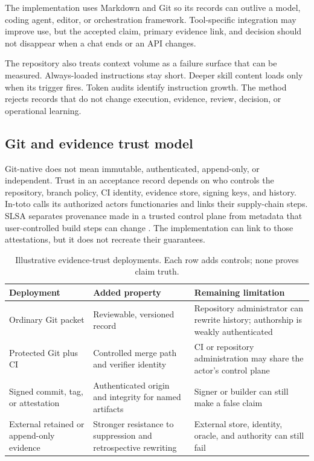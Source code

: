 \documentclass[11pt]{article}
\begin{document}
The implementation uses Markdown and Git so its records can outlive a model, coding agent, editor, or orchestration framework. Tool-specific integration may improve use, but the accepted claim, primary evidence link, and decision should not disappear when a chat ends or an API changes.

The repository also treats context volume as a failure surface that can be measured. Always-loaded instructions stay short. Deeper skill content loads only when its trigger fires. Token audits identify instruction growth. The method rejects records that do not change execution, evidence, review, decision, or operational learning.

\subsection{Git and evidence trust model}

Git-native does not mean immutable, authenticated, append-only, or independent. Trust in an acceptance record depends on who controls the repository, branch policy, CI identity, evidence store, signing keys, and history. In-toto calls its authorized actors functionaries and links their supply-chain steps. SLSA separates provenance made in a trusted control plane from metadata that user-controlled build steps can change \citep{intoto2026,slsa2026}. The implementation can link to those attestations, but it does not recreate their guarantees.

\begin{table}[t]
\centering
\caption{Illustrative evidence-trust deployments. Each row adds controls; none proves claim truth.}
\label{tab:trust}
\small
\begin{tabularx}{\textwidth}{>{\raggedright\arraybackslash}p{} X >{\raggedright\arraybackslash}p{}}
\toprule
Deployment & Added property & Remaining limitation \\
\midrule
Ordinary Git packet & Reviewable, versioned record & Repository administrator can rewrite history; authorship is weakly authenticated \\
Protected Git plus CI & Controlled merge path and verifier identity & CI or repository administration may share the actor's control plane \\
Signed commit, tag, or attestation & Authenticated origin and integrity for named artifacts & Signer or builder can still make a false claim \\
External retained or append-only evidence & Stronger resistance to suppression and retrospective rewriting & External store, identity, oracle, and authority can still fail \\
\bottomrule
\end{tabularx}
\end{table}
\end{document}
